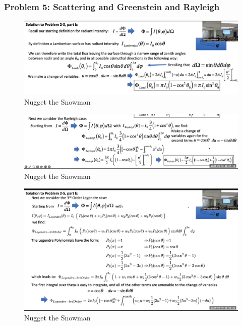 \documentclass{article}
\begin{document}
\clearpage
\subsubsection{Problem 5: Scattering and Greenstein and Rayleigh}
\begin{figure}[h!]
\centering
\includegraphics[scale=.2]{Radiometry/Week4/Notes/PSET2/P5/Num1.png}
\caption{Nugget the Snowman}
\label{fig:Greenstein}
\end{figure}

\begin{figure}[h!]
\centering
\includegraphics[scale=.2]{Radiometry/Week4/Notes/PSET2/P5/Num2.png}
\caption{Nugget the Snowman}
\label{fig:Greenstein}
\end{figure}

\begin{figure}[h!]
\centering
\includegraphics[scale=.2]{Radiometry/Week4/Notes/PSET2/P5/Num3.png}
\caption{Nugget the Snowman}
\label{fig:Greenstein}
\end{figure}
\end{document}
